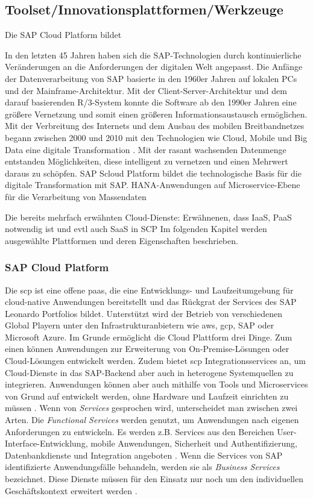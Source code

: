 \subsection{Toolset/Innovationsplattformen/Werkzeuge} \label{toolset}

Die SAP Cloud Platform bildet

In den letzten 45 Jahren haben sich die SAP-Technologien durch kontinuierliche Veränderungen an die Anforderungen der digitalen Welt angepasst. Die Anfänge der Datenverarbeitung von SAP basierte in den 1960er Jahren auf lokalen PCs und der Mainframe-Architektur. Mit der Client-Server-Architektur und dem darauf basierenden R/3-System konnte die Software ab den 1990er Jahren eine größere Vernetzung und somit einen größeren Informationsaustausch ermöglichen. Mit der Verbreitung des Internets und dem Ausbau des mobilen Breitbandnetzes begann zwischen 2000 und 2010 mit den Technologien wie Cloud, Mobile und Big Data eine digitale Transformation \citep[S. 44]{Elsner2018}. Mit der rasant wachsenden Datenmenge entstanden Möglichkeiten, diese intelligent zu vernetzen und einen Mehrwert daraus zu schöpfen.
SAP Scloud Platform bildet die technologische Basis für die digitale Transformation mit SAP.
HANA-Anwendungen auf Microservice-Ebene für die Verarbeitung von Massendaten

Die bereits mehrfach erwähnten Cloud-Dienste: Erwähnenen, dass IaaS, PaaS notwendig ist und evtl auch SaaS in SCP
Im folgenden Kapitel werden ausgewählte Plattformen und deren Eigenschaften beschrieben.

\subsubsection{SAP Cloud Platform} \label{scp}

Die \acf{scp} ist eine offene \ac{paas}, die eine Entwicklungs- und Laufzeitumgebung für cloud-native Anwendungen bereitstellt und das Rückgrat der Services des SAP Leonardo Portfolios bildet. Unterstützt wird der Betrieb von verschiedenen Global Playern unter den Infrastrukturanbietern wie \ac{aws}, \ac{gcp}, SAP oder Microsoft Azure. Im Grunde ermöglicht die Cloud Plattform drei Dinge. Zum einen können Anwendungen zur Erweiterung von On-Premise-Lösungen oder Cloud-Lösungen entwickelt werden. Zudem bietet \ac{scp} Integrationsservices an, um Cloud-Dienste in das SAP-Backend aber auch in heterogene Systemquellen zu integrieren. Anwendungen können aber auch mithilfe von Tools und Microservices von Grund auf entwickelt werden, ohne Hardware und Laufzeit einrichten zu müssen \citep{Acharya2019}.
Wenn von \textit{Services} gesprochen wird, unterscheidet man zwischen zwei Arten.
Die \textit{Functional Services} werden genutzt, um Anwendungen nach eigenen Anforderungen zu entwickeln. Es werden z.B. Services aus den Bereichen User-Interface-Entwicklung, mobile Anwendungen, Sicherheit und Authentifizierung, Datenbankdienste und Integration angeboten \citep{Elsner2018}. Wenn die Services von SAP identifizierte Anwendungsfälle behandeln, werden sie als \textit{Business Services} bezeichnet. Diese Dienste müssen für den Einsatz nur noch um den individuellen Geschäftskontext erweitert werden \citep{Utecht2018}.

